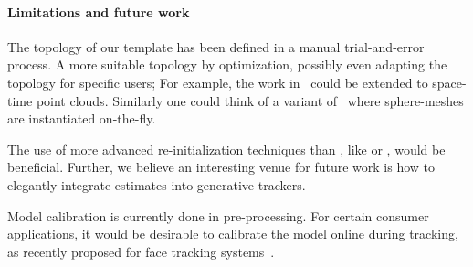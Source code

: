\paragraph{Limitations and future work} 
The topology of our template has been defined in a manual trial-and-error process. A more suitable topology  by optimization, possibly even adapting the topology for specific users; For example, the work in~\cite{thiery2016spheremesh} could be extended to space-time point clouds. Similarly one could think of a variant of~\cite{newcombe2015dynfusion} where sphere-meshes are instantiated on-the-fly.
% 
\begin{draft}
The use of more advanced re-initialization techniques than \cite{qian2014realtime}, like \cite{krupka2014discriminative} or \cite{oberweger2015feedback}, would be beneficial. Further, we believe an interesting venue for future work is how to elegantly integrate  estimates into generative trackers.
\end{draft}
% 
Model calibration is currently done in pre-processing. For certain consumer applications, it would be desirable to calibrate the model online during tracking, as recently proposed for face tracking systems~\cite{bouaziz2013online}. 
% 
